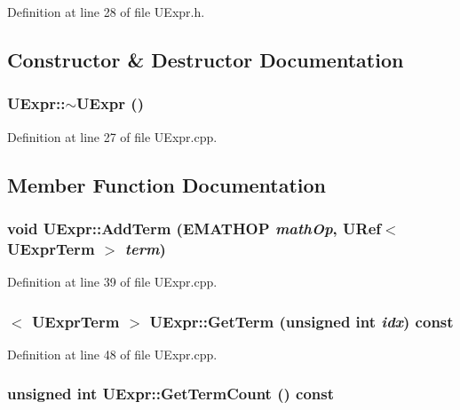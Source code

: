 \begin{CompactItemize}
Definition at line 28 of file UExpr.h.

\subsection{Constructor \& Destructor Documentation}
\hypertarget{class_u_expr_4888c3c61e89866633b80c4a90d98af5}{
\subsubsection[{$\sim$UExpr}]{\setlength{\rightskip}{0pt plus 5cm}UExpr::$\sim$UExpr ()}}
\label{class_u_expr_4888c3c61e89866633b80c4a90d98af5}




Definition at line 27 of file UExpr.cpp.

\subsection{Member Function Documentation}
\hypertarget{class_u_expr_67deee67da12960d637e4bc650480dc2}{
\subsubsection[{AddTerm}]{\setlength{\rightskip}{0pt plus 5cm}void UExpr::AddTerm ({\bf EMATHOP} {\em mathOp}, \/  {\bf URef}$<$ {\bf UExprTerm} $>$ {\em term})}}
\label{class_u_expr_67deee67da12960d637e4bc650480dc2}




Definition at line 39 of file UExpr.cpp.\hypertarget{class_u_expr_9c7716e4671c5de3a98912442a2a3c3a}{
\subsubsection[{GetTerm}]{$<$ {\bf UExprTerm} $>$ UExpr::GetTerm (unsigned int {\em idx}) const}}
\label{class_u_expr_9c7716e4671c5de3a98912442a2a3c3a}




Definition at line 48 of file UExpr.cpp.\hypertarget{class_u_expr_54e08984d3e177691293726435d4cda2}{
\subsubsection[{GetTermCount}]{\setlength{\rightskip}{0pt plus 5cm}unsigned int UExpr::GetTermCount () const}}
\label{class_u_expr_54e08984d3e177691293726435d4cda2}





\end{CompactItemize}
